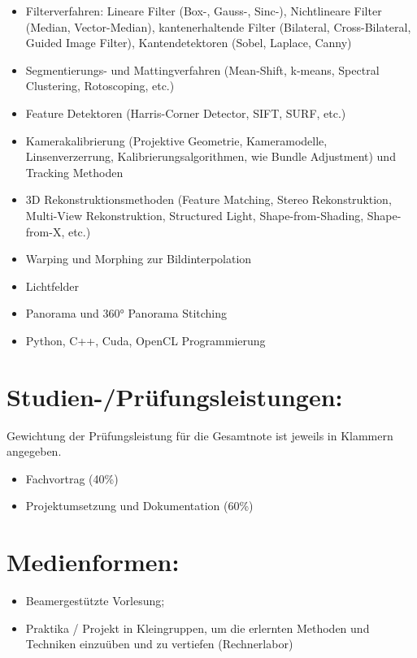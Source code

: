 \begin{itemize}
\tightlist
\item
  Filterverfahren: Lineare Filter (Box-, Gauss-, Sinc-), Nichtlineare
  Filter (Median, Vector-Median), kantenerhaltende Filter (Bilateral,
  Cross-Bilateral, Guided Image Filter), Kantendetektoren (Sobel,
  Laplace, Canny)
\item
  Segmentierungs- und Mattingverfahren (Mean-Shift, k-means, Spectral
  Clustering, Rotoscoping, etc.)
\item
  Feature Detektoren (Harris-Corner Detector, SIFT, SURF, etc.)
\item
  Kamerakalibrierung (Projektive Geometrie, Kameramodelle,
  Linsenverzerrung, Kalibrierungsalgorithmen, wie Bundle Adjustment) und
  Tracking Methoden
\item
  3D Rekonstruktionsmethoden (Feature Matching, Stereo Rekonstruktion,
  Multi-View Rekonstruktion, Structured Light, Shape-from-Shading,
  Shape-from-X, etc.)
\item
  Warping und Morphing zur Bildinterpolation
\item
  Lichtfelder
\item
  Panorama und 360° Panorama Stitching
\item
  Python, C++, Cuda, OpenCL Programmierung
\end{itemize}

\section*{Studien-/Prüfungsleistungen:}\label{studien-pruxfcfungsleistungen-15}

Gewichtung der Prüfungsleistung für die Gesamtnote ist jeweils in
Klammern angegeben.

\begin{itemize}
\tightlist
\item
  Fachvortrag (40\%)
\item
  Projektumsetzung und Dokumentation (60\%)
\end{itemize}

\section*{Medienformen:}\label{medienformen-15}

\begin{itemize}
\tightlist
\item
  Beamergestützte Vorlesung;
\item
  Praktika / Projekt in Kleingruppen, um die erlernten Methoden und
  Techniken einzuüben und zu vertiefen (Rechnerlabor)
\end{itemize}

